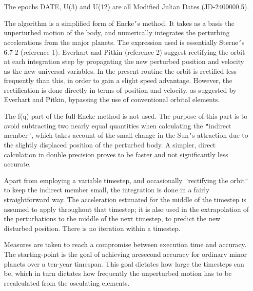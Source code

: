 \documentclass[twoside,11pt]{article}
\renewcommand{\_}{\texttt{\symbol{95}}}
\newcommand{\sstitem}{\item}
\newcommand{\sstitem}{\item}
\begin{document}
{{{         \sstitem
         The epochs DATE, U(3) and U(12) are all Modified Julian Dates
           (JD-2400000.5).

         \sstitem
         The algorithm is a simplified form of Encke{\tt '}s method.  It takes as
           a basis the unperturbed motion of the body, and numerically
           integrates the perturbing accelerations from the major planets.
           The expression used is essentially Sterne{\tt '}s 6.7-2 (reference 1).
           Everhart and Pitkin (reference 2) suggest rectifying the orbit at
           each integration step by propagating the new perturbed position
           and velocity as the new universal variables.  In the present
           routine the orbit is rectified less frequently than this, in order
           to gain a slight speed advantage.  However, the rectification is
           done directly in terms of position and velocity, as suggested by
           Everhart and Pitkin, bypassing the use of conventional orbital
           elements.

      }
        The f(q) part of the full Encke method is not used.  The purpose
        of this part is to avoid subtracting two nearly equal quantities
        when calculating the {\tt "}indirect member{\tt "}, which takes account of the
        small change in the Sun{\tt '}s attraction due to the slightly displaced
        position of the perturbed body.  A simpler, direct calculation in
        double precision proves to be faster and not significantly less
        accurate.

        Apart from employing a variable timestep, and occasionally
        {\tt "}rectifying the orbit{\tt "} to keep the indirect member small, the
        integration is done in a fairly straightforward way.  The
        acceleration estimated for the middle of the timestep is assumed
        to apply throughout that timestep;  it is also used in the
        extrapolation of the perturbations to the middle of the next
        timestep, to predict the new disturbed position.  There is no
        iteration within a timestep.

        Measures are taken to reach a compromise between execution time
        and accuracy.  The starting-point is the goal of achieving
        arcsecond accuracy for ordinary minor planets over a ten-year
        timespan.  This goal dictates how large the timesteps can be,
        which in turn dictates how frequently the unperturbed motion has
        to be recalculated from the osculating elements.

}}
\end{document}
